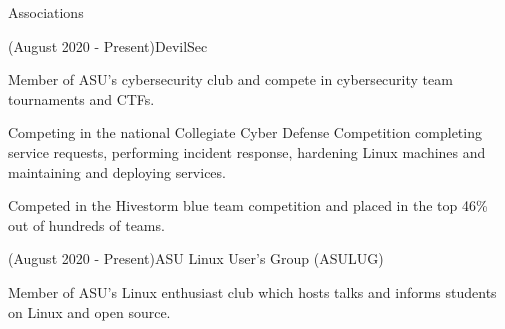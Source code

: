 \documentclass{article}
\newlength{\tabin}
\newlength{\secsep}
\newcommand{\lineunder}{\vspace*{-8pt} \\ \hspace*{-6pt} \hrulefill \\ \vspace*{-15pt}}
\newenvironment{tabbedsection}[1]{
  \begin{list}{}{
      \setlength{\itemsep}{0pt}
      \setlength{\labelsep}{0pt}
      \setlength{\labelwidth}{0pt}
      \setlength{\leftmargin}{\tabin}
      \setlength{\rightmargin}{\tabin}
      \setlength{\listparindent}{0pt}
      \setlength{\parsep}{0pt}
      \setlength{\parskip}{0pt}
      \setlength{\partopsep}{0pt}
      \setlength{\topsep}{#1}
    }
  \item[]
}{\end{list}}
\newenvironment{resume_section}[1]{
  \filbreak
  \vspace{2\secsep}
  \textsc{\color{blue}\large#1}
  \lineunder
  \begin{tabbedsection}{\secsep}
}{\end{tabbedsection}}
\newenvironment{resume_subsection}[2]{
  \textbf{\color{BlueViolet}#2} \hfill {\normalsize #1} \hspace{-5em} 
  \begin{tabbedsection}{0.5\secsep}
  \begin{subitems}
}{\end{subitems}\end{tabbedsection}}
\newenvironment{subitems}{
  \renewcommand{\labelitemi}{-}
  \begin{itemize}
      \setlength{\labelsep}{1em}
}{\end{itemize}}
\begin{document}
\vspace{2\secsep}

\begin{resume_section}{Associations}
  	\begin{resume_subsection}{(August 2020 - Present)}{DevilSec}
		\item Member of ASU's cybersecurity club and compete in cybersecurity team tournaments and CTFs.
        \item Competing in the national Collegiate Cyber Defense Competition completing service requests, performing incident response, hardening Linux machines and maintaining and deploying services.
        \item Competed in the Hivestorm blue team competition and placed in the top 46\% out of hundreds of teams.
  	\end{resume_subsection}
  	\vspace{2\secsep}
  	\begin{resume_subsection}{(August 2020 - Present)}{ASU Linux User's Group (ASULUG)}
        \item Member of ASU's Linux enthusiast club which hosts talks and informs students on Linux and open source. 
  	\end{resume_subsection}
\end{resume_section}
\end{document}
